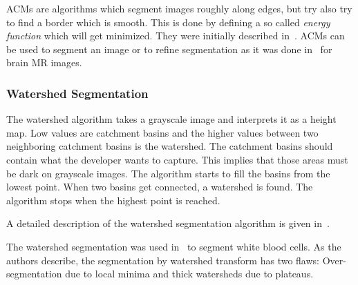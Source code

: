 \Glspl{ACM} are algorithms which segment images roughly along edges, but try
also try to find a border which is smooth. This is done by defining a so called
\textit{energy function} which will get minimized. They were initially
described in~\cite{kass1988snakes}. \Glspl{ACM} can be used to segment an image
or to refine segmentation as it was done in~\cite{atkins1998fully} for brain
\gls{MR} images.


\subsubsection{Watershed Segmentation}\label{subsec:watershed}
The watershed algorithm takes a grayscale image and interprets it as a height
map. Low values are catchment basins and the higher values between two
neighboring catchment basins is the watershed. The catchment basins should
contain what the developer wants to capture. This implies that those areas
must be dark on grayscale images. The algorithm starts to fill the basins from
the lowest point. When two basins get connected, a watershed is found. The
algorithm stops when the highest point is reached.

A detailed description of the watershed segmentation algorithm is given
in~\cite{roerdink2000watershed}.

The watershed segmentation was used in~\cite{1260033} to segment white blood
cells. As the authors describe, the segmentation by watershed transform has
two flaws: Over-segmentation due to local minima and thick watersheds due to
plateaus.
